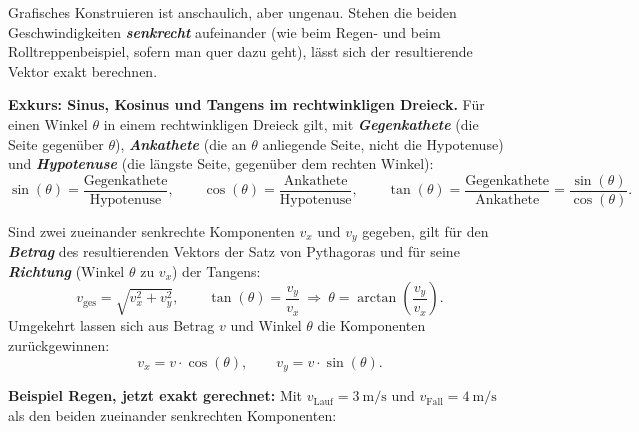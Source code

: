 \documentclass[addpoints,11pt,a4paper]{exam}
\begin{document}
\begin{theoriebox}
Grafisches Konstruieren ist anschaulich, aber ungenau. Stehen die beiden
Geschwindigkeiten \textbf{\emph{senkrecht}} aufeinander (wie beim Regen- und
beim Rolltreppenbeispiel, sofern man quer dazu geht), lässt sich der
resultierende Vektor exakt berechnen.

\textbf{Exkurs: Sinus, Kosinus und Tangens im rechtwinkligen Dreieck.} Für
einen Winkel $\theta$ in einem rechtwinkligen Dreieck gilt, mit
\textbf{\emph{Gegenkathete}} (die Seite gegenüber $\theta$),
\textbf{\emph{Ankathete}} (die an $\theta$ anliegende Seite, nicht die
Hypotenuse) und \textbf{\emph{Hypotenuse}} (die längste Seite, gegenüber
dem rechten Winkel):
\[
  \sin(\theta) = \frac{\text{Gegenkathete}}{\text{Hypotenuse}}, \qquad
  \cos(\theta) = \frac{\text{Ankathete}}{\text{Hypotenuse}}, \qquad
  \tan(\theta) = \frac{\text{Gegenkathete}}{\text{Ankathete}} = \frac{\sin(\theta)}{\cos(\theta)}.
\]

\begin{center}
\end{center}

\begin{formelbox}
Sind zwei zueinander senkrechte Komponenten $v_x$ und $v_y$ gegeben, gilt
für den \textbf{\emph{Betrag}} des resultierenden Vektors der Satz von
Pythagoras und für seine \textbf{\emph{Richtung}} (Winkel $\theta$ zu
$v_x$) der Tangens:
\[
  \boxed{v_{\text{ges}} = \sqrt{v_x^2+v_y^2}}, \qquad
  \boxed{\tan(\theta) = \frac{v_y}{v_x}} \ \Longrightarrow\ \theta = \arctan\!\left(\frac{v_y}{v_x}\right).
\]
Umgekehrt lassen sich aus Betrag $v$ und Winkel $\theta$ die Komponenten
zurückgewinnen:
\[
  v_x = v\cdot\cos(\theta), \qquad v_y = v\cdot\sin(\theta).
\]
\end{formelbox}

\textbf{Beispiel Regen, jetzt exakt gerechnet:} Mit
$v_{\text{Lauf}}=\SI{3}{\meter\per\second}$ und
$v_{\text{Fall}}=\SI{4}{\meter\per\second}$ als den beiden zueinander
senkrechten Komponenten:


\end{theoriebox}
\end{document}
